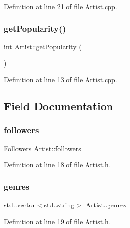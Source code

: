 Definition at line 21 of file Artist.\+cpp.

\mbox{\label{class_artist_a8d91d35e7e113becb0dbffa214baa483}} 
\subsubsection{\texorpdfstring{get\+Popularity()}{getPopularity()}}
{\footnotesize\ttfamily int Artist\+::get\+Popularity (\begin{DoxyParamCaption}{ }\end{DoxyParamCaption})}



Definition at line 13 of file Artist.\+cpp.



\subsection{Field Documentation}
\mbox{\label{class_artist_a34417aa94c0323986e63915ac0e10925}} 
\subsubsection{\texorpdfstring{followers}{followers}}
{\footnotesize\ttfamily \mbox{\hyperlink{class_followers}{Followers}} Artist\+::followers\hspace{0.3cm}{\ttfamily [private]}}



Definition at line 18 of file Artist.\+h.

\mbox{\label{class_artist_a4e6b54e647382646bc57ecf449a22b48}} 
\subsubsection{\texorpdfstring{genres}{genres}}
{\footnotesize\ttfamily std\+::vector$<$std\+::string$>$ Artist\+::genres\hspace{0.3cm}{\ttfamily [private]}}



Definition at line 19 of file Artist.\+h.


